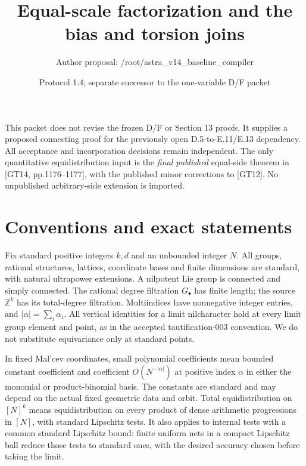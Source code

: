 \documentclass[11pt]{article}
\title{Equal-scale factorization and the bias and torsion joins}
\author{Author proposal: /root/astra\_v14\_baseline\_compiler}
\date{Protocol 1.4; separate successor to the one-variable D/F packet}
\newcommand{\Z}{\mathbb Z}\newcommand{\R}{\mathbb R}
\begin{document}
\maketitle
\noindent This packet does not revise the frozen D/F or Section 13 proofs.
It supplies a proposed connecting proof for the previously open
D.5-to-E.11/E.13 dependency. All acceptance and incorporation decisions
remain independent. The only quantitative equidistribution input is the
\emph{final published} equal-side theorem in [GT14, pp.1176--1177], with
the published minor corrections to [GT12]. No unpublished arbitrary-side
extension is imported.

\section{Conventions and exact statements}
Fix standard positive integers $k,d$ and an unbounded integer $N$.
All groups, rational structures, lattices, coordinate bases and finite
dimensions are standard, with natural ultrapower extensions. A nilpotent
Lie group is connected and simply connected. The rational degree filtration
$G_\bullet$ has finite length; the source $\Z^k$ has its total-degree
filtration. Multiindices have nonnegative integer entries, and
$|\alpha|=\sum_i\alpha_i$. All vertical identities for a limit nilcharacter
hold at every limit group element and point, as in the accepted
tautification-003 convention. We do not substitute equivariance only at
standard points.

In fixed Mal'cev coordinates, small polynomial coefficients mean bounded
constant coefficient and coefficient $O(N^{-|\alpha|})$ at positive index
$\alpha$ in either the monomial or product-binomial basis. The constants
are standard and may depend on the actual fixed geometric data and orbit.
Total equidistribution on $[N]^k$ means equidistribution on every product
of dense arithmetic progressions in $[N]$, with standard Lipschitz tests.
It also applies to internal tests with a common standard Lipschitz bound:
finite uniform nets in a compact Lipschitz ball reduce those tests to
standard ones, with the desired accuracy chosen before taking the limit.
\end{document}
